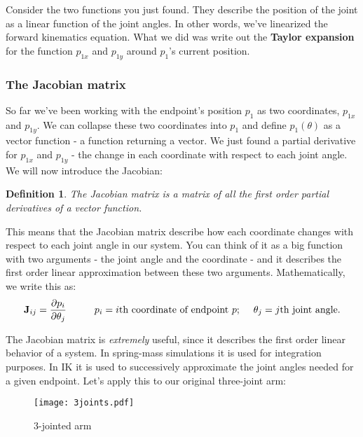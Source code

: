 \documentclass[]{article}
\newtheorem{definition}{Definition}
\begin{document}
Consider the two functions you just found. They describe the position of the joint as a linear function of the joint angles. In other words, we've linearized the forward kinematics equation. What we did was write out the \textbf{Taylor expansion} for the function $p_{1x}$ and $p_{1y}$ around $p_1$'s current position.

\subsubsection{The Jacobian matrix}

So far we've been working with the endpoint's position $p_1$ as two coordinates, $p_{1x}$ and $p_{1y}$. We can collapse these two coordinates into $p_1$ and define $p_1(\theta)$ as a vector function - a function returning a vector. We just found a partial derivative for $p_{1x}$ and $p_{1y}$ - the change in each coordinate with respect to each joint angle. We will now introduce the Jacobian:

\begin{definition}
The Jacobian matrix is a matrix of all the first order partial derivatives of a vector function.
\end{definition}

This means that the Jacobian matrix describe how each coordinate changes with respect to each joint angle in our system. You can think of it as a big function with two arguments - the joint angle and the coordinate - and it describes the first order linear approximation between these two arguments. Mathematically, we write this as:
\begin{equation}
    \mathbf{J}_{ij} = \frac{\partial p_{i}}{\partial \theta_j} \hspace{1cm} p_{i} = \text{$i$th coordinate of endpoint $p$;} \hspace{0.5cm} \theta_j = \text{$j$th joint angle.}
\end{equation}

The Jacobian matrix is \emph{extremely} useful, since it describes the first order linear behavior of a system. In spring-mass simulations it is used for integration purposes. In IK it is used to successively approximate the joint angles needed for a given endpoint. Let's apply this to our original three-joint arm:
\begin{figure}[htp]
    \centering
        \texttt{[image: 3joints.pdf]}
        \label{3jointarm2}
    \caption{3-jointed arm}
\end{figure}
\end{document}
